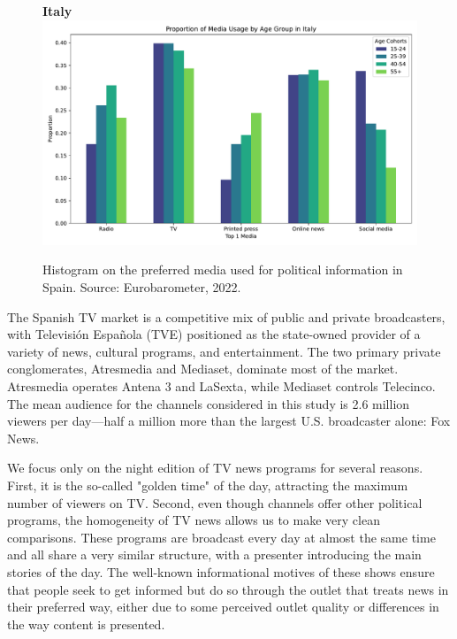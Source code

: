 \documentclass[12pt]{article}
\begin{document}
\begin{figure}[h!]
\begin{minipage}[b]{0.45\textwidth}
	\end{minipage}
	\hfill
	\begin{minipage}[b]{0.45\textwidth}
		\centering
		\textbf{ Italy}
		\includegraphics[width=\textwidth]{figures/media_it}
	\end{minipage}
	\caption{Histogram on the preferred media used for political information in Spain.  
	Source: Eurobarometer, 2022. }
\label{fig:motivation}
\end{figure}




The Spanish TV market is a competitive mix of public and private broadcasters, with Televisión Española (TVE) positioned as the state-owned provider of a variety of news, cultural programs, and entertainment. The two primary private conglomerates, Atresmedia and Mediaset, dominate most of the market. Atresmedia operates Antena 3 and LaSexta, while Mediaset controls Telecinco. The mean audience for the channels considered in this study is 2.6 million viewers per day—half a million more than the largest U.S. broadcaster alone: Fox News.

We focus only on the night edition of TV news programs for several reasons. First, it is the so-called "golden time" of the day, attracting the maximum number of viewers on TV. Second, even though channels offer other political programs, the homogeneity of TV news allows us to make very clean comparisons. These programs are broadcast every day at almost the same time and all share a very similar structure, with a presenter introducing the main stories of the day. The well-known informational motives of these shows ensure that people seek to get informed but do so through the outlet that treats news in their preferred way, either due to some perceived outlet quality or differences in the way content is presented.
\end{document}
